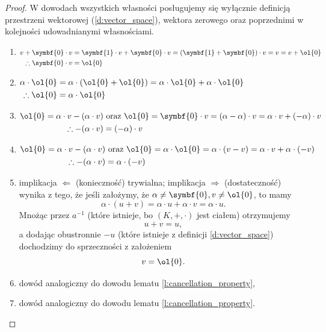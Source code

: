 \begin{proof}
    W dowodach wszystkich własności posługujemy się wyłącznie definicją przestrzeni wektorowej (\ref{d:vector_space}), wektora zerowego oraz poprzednimi w kolejności udowadnianymi własnościami.
    \begin{enumerate}
        \item $\begin{aligned}[t]
            v + \symbf{0} \cdot v &= \symbf{1} \cdot v + \symbf{0} \cdot v = (\symbf{1} + \symbf{0}) \cdot v = v = v + \ol{0} \\
            \therefore \symbf{0} \cdot v &= \ol{0}
            \end{aligned}$
        \item $\begin{aligned}[t]
            \alpha \cdot \ol{0} &= \alpha \cdot (\ol{0} + \ol{0}) = \alpha \cdot \ol{0} + \alpha \cdot \ol{0} \\
            \therefore \ol{0} &= \alpha \cdot \ol{0}
            \end{aligned}$
        \item $\begin{aligned}[t]
            \ol{0} = \alpha \cdot v - (\alpha \cdot v) &\text{ oraz } \ol{0} = \symbf{0} \cdot v = (\alpha - \alpha) \cdot v = \alpha \cdot v + (-\alpha) \cdot v \\
            \therefore -(\alpha \cdot v) &= (-\alpha) \cdot v
            \end{aligned}$
        \item $\begin{aligned}[t]
            \ol{0} = \alpha \cdot v - (\alpha \cdot v) &\text{ oraz } \ol{0} = \alpha \cdot \ol{0} = \alpha \cdot (v - v) = \alpha \cdot v + \alpha \cdot (-v) \\
            \therefore -(\alpha \cdot v) &= \alpha \cdot (-v)
            \end{aligned}$
        \item implikacja $\Leftarrow$ (konieczność) trywialna; implikacja $\Rightarrow$ (dostateczność) wynika z tego, że jeśli założymy, że $\alpha \neq \symbf{0}, v \neq \ol{0}$, to mamy
            \[ \alpha \cdot (u + v) = \alpha \cdot u + \alpha \cdot v = \alpha \cdot u. \]
            Mnożąc przez $a^{-1}$ (które istnieje, bo $(K, +, \cdot)$ jest ciałem) otrzymujemy
            \[ u + v = u, \]
            a dodając obustronnie $-u$ (które istnieje z definicji \ref{d:vector_space}) dochodzimy do sprzeczności z założeniem
            \[ v = \ol{0}. \]
        \item dowód analogiczny do dowodu lematu \ref{l:cancellation_property},
        \item dowód analogiczny do dowodu lematu \ref{l:cancellation_property}.
    \end{enumerate}
\end{proof}

